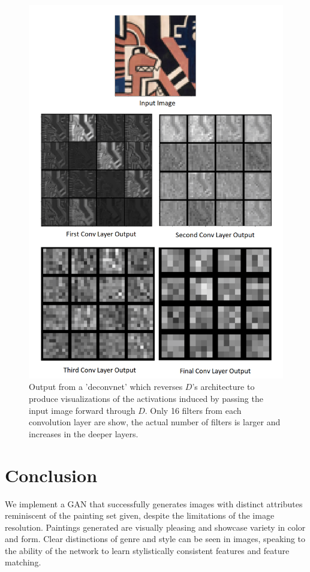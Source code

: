 \documentclass[10pt,twocolumn,letterpaper]{article}
\begin{document}
\begin{figure}[t]
	\begin{center}
		\includegraphics[width=0.9\linewidth]{deconv_full.png}
	\end{center}
	\caption{Output from a 'deconvnet' which reverses $ D $'s architecture to produce visualizations of the activations induced by passing the input image forward through $ D $. Only 16 filters from each convolution layer are show, the actual number of filters is larger and increases in the deeper layers.}
	\label{fig:long}
	\label{fig:onecol}
\end{figure}

\section{Conclusion}
We implement a GAN that successfully generates images with distinct attributes reminiscent of the painting set given, despite the limitations of the image resolution. Paintings generated are visually pleasing and showcase variety in color and form. Clear distinctions of genre and style can be seen in images, speaking to the ability of the network to learn stylistically consistent features and feature matching.
\end{document}
